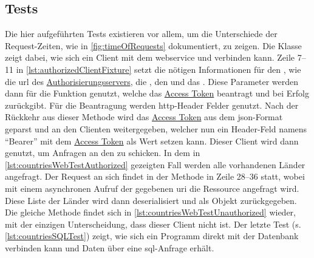 \subsection{Tests}\label{subsec:tests}
	Die hier aufgeführten Tests existieren vor allem,
	um die Unterschiede der Request-Zeiten,
	wie in \vref{fig:timeOfRequests} dokumentiert,
	zu zeigen.
	Die Klasse  zeigt dabei,
	wie sich ein Client mit dem \gls{webservice}  und verbinden kann.
	Zeile 7--11 in \vref{lst:authorizedClientFixture} setzt die nötigen Informationen
	für den ,
	wie die \gls{url} des \hyperref[sec:authorization-server]{Authorisierungsservers},
	die ,
	den  und das .
	Diese Parameter werden dann für die Funktion  genutzt,
	welche das \hyperref[par:access-token]{Access Token} beantragt
	und bei Erfolg zurückgibt.
	Für die Beantragung werden \gls{http}-Header Felder genutzt.
	Nach der Rückkehr aus dieser Methode wird das \hyperref[par:access-token]{Access Token} aus dem \gls{json}-Format geparst
	und an den Clienten weitergegeben,
	welcher nun ein Header-Feld namens \enquote{Bearer} mit dem \hyperref[par:access-token]{Access Token} als Wert setzen kann.
	Dieser Client wird dann genutzt,
	um  Anfragen an den  zu schicken.
	In dem in \vref{lst:countriesWebTestAuthorized} gezeigten Fall werden alle vorhandenen Länder angefragt.
	Der Request an sich findet in der Methode  in Zeile 28--36 statt,
	wobei mit einem asynchronen Aufruf der gegebenen \gls{uri} die Ressource angefragt wird.
	Diese Liste der Länder wird dann deserialisiert
	und als  Objekt zurückgegeben.
	Die gleiche Methode findet sich in \vref{lst:countriesWebTestUnauthorized} wieder,
	mit der einzigen Unterscheidung,
	dass dieser Client nicht  ist.
	Der letzte Test (s. \vref{lst:countriesSQLTest}) zeigt,
	wie sich ein Programm direkt mit der Datenbank verbinden kann
	und Daten über eine \gls{sql}-Anfrage erhält.